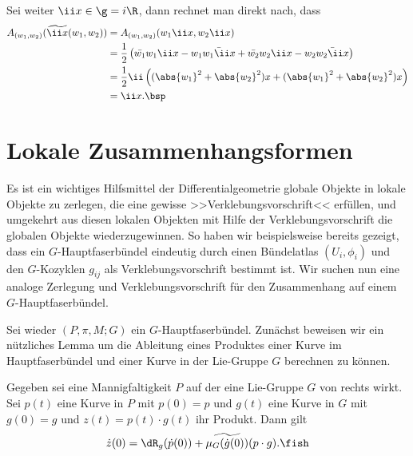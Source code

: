 \documentclass[%
	paper=a5,%
	fleqn,%
	DIV=18,%
	BCOR=0mm,
	fontsize=11pt,
	titlepage=false,%
	bibliography=totoc,
	DIV=18,%
	twoside=true,
	pdftitle=Riemannsche Geometrie,
	pdfauthor=Uwe Semmelmann,
	numbers=noendperiod]%
	{scrbook}
\begin{document}
\begin{ex}
Sei weiter $\ii x\in \g = i\R$, dann rechnet man direkt nach, dass
\begin{align*}
A_{(w_1,w_2)}(\widetilde{\ii x}(w_1,w_2)) &= 
A_{(w_1,w_2)}(w_1\ii x,w_2\ii x) \\ &= 
\frac{1}{2}
\left(\bar{w_1}w_1\ii x - w_1\bar{w_1\ii x}
+ \bar{w_2}w_2\ii x - w_2\bar{w_2\ii x}
\right) \\ 
&=
\frac{1}{2}
\ii \left((\abs{w_1}^2 + \abs{w_2}^2)x + (\abs{w_1}^2 + \abs{w_2}^2)x
\right)\\
&= \ii x.\bsp
\end{align*}
\end{ex}


\section{Lokale Zusammenhangsformen}

Es ist ein wichtiges Hilfsmittel der Differentialgeometrie globale Objekte in
lokale Objekte zu zerlegen, die eine gewisse >>Verklebungsvorschrift<< erfüllen,
und umgekehrt aus diesen lokalen Objekten mit Hilfe der Verklebungsvorschrift
die globalen Objekte wiederzugewinnen. So haben wir beispielsweise bereits
gezeigt, dass ein $G$-Hauptfaserbündel eindeutig durch einen Bündelatlas
$(U_i,\phi_i)$ und den $G$-Kozyklen $g_{ij}$ als Verklebungsvorschrift bestimmt
ist. Wir suchen nun eine analoge Zerlegung und Verklebungsvorschrift für den
Zusammenhang auf einem $G$-Hauptfaserbündel.

Sei wieder $(P,\pi,M;G)$ ein $G$-Hauptfaserbündel. Zunächst beweisen wir ein
nützliches Lemma um die Ableitung eines Produktes einer Kurve im
Hauptfaserbündel und einer Kurve in der Lie-Gruppe $G$ berechnen zu können.

\begin{lem}[Produktformel]
\label{prop:Produktformel}
Gegeben sei eine Mannigfaltigkeit $P$ auf der eine
Lie-Gruppe $G$ von rechts wirkt. Sei $p(t)$ eine Kurve in $P$ mit $p(0) = p$ und
$g(t)$  eine Kurve in $G$ mit $g(0) = g$ und $z(t) = p(t)\cdot g(t)$ ihr
Produkt. Dann gilt
\begin{align*}
\dot{z}(0) = \dR_g(\dot{p}(0)) + \widetilde{\mu_G(\dot{g}(0))}(p\cdot g).\fish
\end{align*}
\end{lem}
\end{document}
